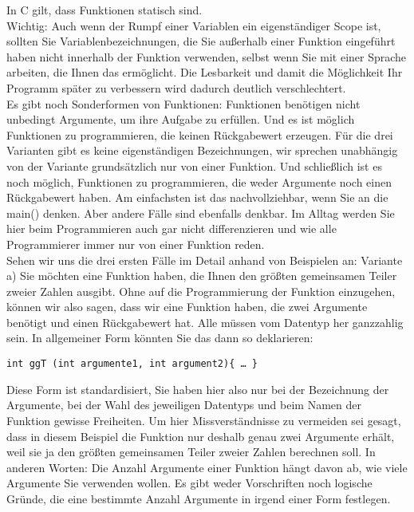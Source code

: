 In C gilt, dass Funktionen statisch sind.\\

Wichtig: Auch wenn der Rumpf einer Variablen ein eigenständiger Scope ist, sollten Sie Variablenbezeichnungen, die Sie außerhalb einer Funktion eingeführt haben nicht innerhalb der Funktion verwenden, selbst wenn Sie mit einer Sprache arbeiten, die Ihnen das ermöglicht. Die Lesbarkeit und damit die Möglichkeit Ihr Programm später zu verbessern wird dadurch deutlich verschlechtert.\\

Es gibt noch Sonderformen von Funktionen: Funktionen benötigen nicht unbedingt Argumente, um ihre Aufgabe zu erfüllen. Und es ist möglich Funktionen zu programmieren, die keinen Rückgabewert erzeugen. Für die drei Varianten gibt es keine eigenständigen Bezeichnungen, wir sprechen unabhängig von der Variante grundsätzlich nur von einer \glqq{}Funktion\grqq{}. Und schließlich ist es noch möglich, Funktionen zu programmieren, die weder Argumente noch einen Rückgabewert haben. Am einfachsten ist das nachvollziehbar, wenn Sie an die main() denken. Aber andere Fälle sind ebenfalls denkbar. Im Alltag werden Sie hier beim Programmieren auch gar nicht differenzieren und wie alle Programmierer immer \glqq{}nur\grqq{} von einer Funktion reden.\\

Sehen wir uns die drei ersten Fälle im Detail anhand von Beispielen an:
Variante a) Sie möchten eine Funktion haben, die Ihnen den größten gemeinsamen Teiler zweier Zahlen ausgibt. Ohne auf die Programmierung der Funktion einzugehen, können wir also sagen, dass wir eine Funktion haben, die zwei Argumente benötigt und einen Rückgabewert hat. Alle müssen vom Datentyp her ganzzahlig sein. In allgemeiner Form könnten Sie das dann so deklarieren:

\begin{verbatim}
int ggT (int argumente1, int argument2){ … }
\end{verbatim}

Diese Form ist standardisiert, Sie haben hier also nur bei der Bezeichnung der Argumente, bei der Wahl des jeweiligen Datentyps und beim Namen der Funktion gewisse Freiheiten. Um hier Missverständnisse zu vermeiden sei gesagt, dass in diesem Beispiel die Funktion nur deshalb genau zwei Argumente erhält, weil sie ja den größten gemeinsamen Teiler zweier Zahlen berechnen soll. In anderen Worten: Die Anzahl Argumente einer Funktion hängt davon ab, wie viele Argumente Sie verwenden wollen. Es gibt weder Vorschriften noch logische Gründe, die eine bestimmte Anzahl Argumente in irgend einer Form festlegen.\\

